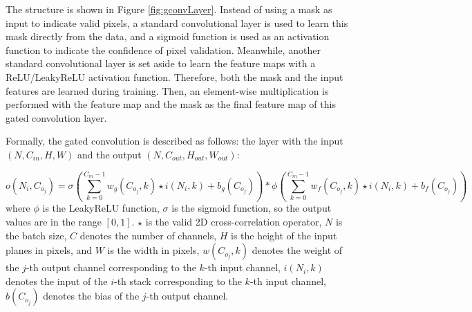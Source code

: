 The structure is shown in Figure \ref{fig:gconvLayer}. Instead of using a mask as input to indicate valid pixels, a standard convolutional layer is used to learn this mask directly from the data, and a sigmoid function is used as an activation function to indicate the confidence of pixel validation. Meanwhile, another standard convolutional layer is set aside to learn the feature maps with a ReLU/LeakyReLU activation function. Therefore, both the mask and the input features are learned during training.  Then, an element-wise multiplication is performed with the feature map and the mask as the final feature map of this gated convolution layer. 

Formally, the gated convolution is described as follows: the layer with the input $ (N, C_{in}, H, W) $ and the output $ (N, C_{out}, H_{out}, W_{out}) $:

\begin{equation}\label{gconv}
	o(N_i, C_{o_j}) = \sigma(\sum_{k=0}^{C_{in}-1}w_g(C_{o_j}, k) \star i(N_i,k) + b_g(C_{o_j})) * 
	\phi (\sum_{k=0}^{C_{in}-1}w_f(C_{o_j}, k) \star i(N_i,k) + b_f(C_{o_j}))
\end{equation}
where $ \phi $ is the LeakyReLU function, $ \sigma $ is the sigmoid function, so the output values are in the range $ [0,1] $. $ \star $ is the valid 2D cross-correlation operator, $ N $ is the batch size, $ C $ denotes the number of channels, $ H $ is the height of the input planes in pixels, and $ W $ is the width in pixels, $ w(C_{o_j},k) $ denotes the weight of the $ j $-th output channel corresponding to the $ k $-th input channel, $ i(N_i, k) $ denotes the input of the $ i $-th stack corresponding to the $ k $-th input channel, $ b(C_{o_j}) $ denotes the bias of the $ j $-th output channel.


